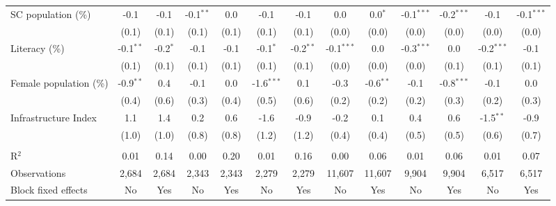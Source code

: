 \begin{adjustbox}{max width=\linewidth}
\begin{threeparttable}[b]
\begin{tabular}{lcccccccccccc}
         SC population (\%)      & -0.1         & -0.1       & -0.1$^{**}$ & 0.0         & -0.1          & -0.1        & 0.0          & 0.0$^{*}$   & -0.1$^{***}$ & -0.2$^{***}$ & -0.1         & -0.1$^{***}$\\
                                 & (0.1)        & (0.1)      & (0.1)       & (0.1)       & (0.1)         & (0.1)       & (0.0)        & (0.0)       & (0.0)        & (0.0)        & (0.0)        & (0.0)\\
         Literacy (\%)           & -0.1$^{**}$  & -0.2$^{*}$ & -0.1        & -0.1        & -0.1$^{*}$    & -0.2$^{**}$ & -0.1$^{***}$ & 0.0         & -0.3$^{***}$ & 0.0          & -0.2$^{***}$ & -0.1\\
                                 & (0.1)        & (0.1)      & (0.1)       & (0.1)       & (0.1)         & (0.1)       & (0.0)        & (0.0)       & (0.0)        & (0.1)        & (0.1)        & (0.1)\\
         Female population (\%)  & -0.9$^{**}$  & 0.4        & -0.1        & 0.0         & -1.6$^{***}$  & 0.1         & -0.3         & -0.6$^{**}$ & -0.1         & -0.8$^{***}$ & -0.1         & 0.0\\
                                 & (0.4)        & (0.6)      & (0.3)       & (0.4)       & (0.5)         & (0.6)       & (0.2)        & (0.2)       & (0.2)        & (0.3)        & (0.2)        & (0.3)\\
         Infrastructure Index    & 1.1          & 1.4        & 0.2         & 0.6         & -1.6          & -0.9        & -0.2         & 0.1         & 0.4          & 0.6          & -1.5$^{**}$  & -0.9\\
                                 & (1.0)        & (1.0)      & (0.8)       & (0.8)       & (1.2)         & (1.2)       & (0.4)        & (0.4)       & (0.5)        & (0.5)        & (0.6)        & (0.7)\\
          \\
         R$^2$                   & 0.01         & 0.14       & 0.00        & 0.20        & 0.01          & 0.16        & 0.00         & 0.06        & 0.01         & 0.06         & 0.01         & 0.07\\
         Observations            & 2,684        & 2,684      & 2,343       & 2,343       & 2,279         & 2,279       & 11,607       & 11,607      & 9,904        & 9,904        & 6,517        & 6,517\\
         Block fixed effects     & No           & Yes        & No          & Yes         & No            & Yes         & No           & Yes         & No           & Yes          & No           & Yes\\
         \bottomrule
      \end{tabular}


\end{threeparttable}
\end{adjustbox}
